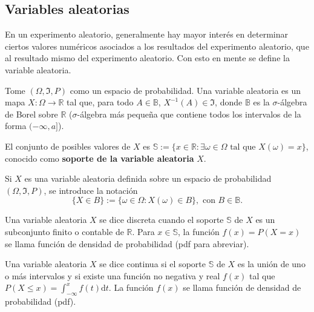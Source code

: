 	\subsection{Variables aleatorias}
	En un experimento aleatorio, generalmente hay mayor interés en determinar ciertos valores numéricos asociados a los resultados del experimento aleatorio, que al resultado mismo del experimento aleatorio. Con esto en mente se define la variable aleatoria.

	\begin{defi}
	Tome $(\Omega, \Im, P)$ como un espacio de probabilidad. Una variable aleatoria es un mapa $X:\Omega\rightarrow \mathbb{R}$ tal que, para todo $A\in\mathbb{B}$, $X^{-1}(A)\in\Im$, donde $\mathbb{B}$ es la $\sigma$-álgebra de Borel sobre $\mathbb{R}$ ($\sigma$-álgebra más pequeña que contiene todos los intervalos de la forma $(-\infty, a]$).
	
	El conjunto de posibles valores de $X$ es $\mathbb{S}:=\{x\in\mathbb{R}:\exists \omega\in\Omega\text{ tal que }X(\omega)=x\}$, conocido como \textbf{soporte de la variable aleatoria }$X$.
	\end{defi}
	Si $X$ es una variable aleatoria definida sobre un  espacio de probabilidad $(\Omega, \Im, P)$, se introduce la notación
	$$\{X\in B\}:=\{\omega\in\Omega: X(\omega)\in B\}, \text{ con }B\in\mathbb{B}.$$
	\begin{defi}
		Una variable aleatoria $X$ se dice discreta cuando el soporte $\mathbb{S}$ de $X$ es un subconjunto finito o contable de $\mathbb{R}$. Para $x\in\mathbb{S}$, la función $f(x)=P(X=x)$ se llama función de densidad de probabilidad (pdf para abreviar).
	\end{defi}
	
	\begin{defi}
		Una variable aleatoria $X$ se dice continua si el soporte $\mathbb{S}$ de $X$ es la unión de uno o más intervalos y si existe una función no negativa y real $f(x)$ tal que $P(X\leq x)=\int_{-\infty}^x f(t)\mathrm{d}t.$ La función $f(x)$ se llama función de densidad de probabilidad (pdf).
	\end{defi}
	
